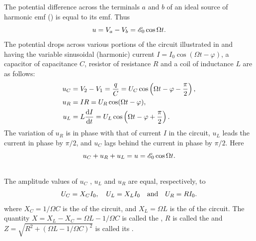 \subsection{}\label{29.3.4} The potential difference across the terminals $a$ and $b$ of an ideal source of harmonic emf () is equal to its emf. Thus
\begin{equation*}%
u = V_{a} - V_{b} = \emf_{0} \cos \Omega t.
\end{equation*}
The potential drops across various portions of the circuit illustrated in  and having the variable sinusoidal (harmonic) current $I = I_{0}\cos (\Omega t - \varphi)$, a capacitor of capacitance $C$, resistor of resistance $R$ and a coil of inductance $L$ are as follows:
\begin{align*}%
u_{C} & = V_{2} - V_{1} = \frac{q}{C} = U_{C} \cos \left( \Omega t - \varphi - \frac{\pi}{2} \right), \\ 
u_{R} & = IR =  U_{R} \cos ( \Omega t - \varphi), \\ 
u_{L} & = L \dv{I}{t} = U_{L} \cos \left( \Omega t - \varphi + \frac{\pi}{2} \right).
\end{align*}
The variation of $u_{R}$ is in phase with that of current $I$ in the circuit, $u_{L}$ leads the current in phase by $\pi/2$, and $u_{C}$ lags behind the current in phase by $\pi/2$. Here
\begin{equation*}%
u_{C} + u_{R} + u_{L} = u =  \emf_{0} \cos \Omega t.
\end{equation*}

\subsection{}\label{29.3.5} The amplitude values of $u_{C}$ , $u_{L}$ and $u_{R}$ are equal, respectively, to
\begin{equation*}%
U_{C} = X_{C}I_{0}, \quad U_{L}= X_{L}I_{0} \qand U_{R}  =RI_{0}.
\end{equation*}
where $X_{C} = 1/\Omega C$ is the  of the circuit, and $X_{L} = \Omega L$ is the  of the circuit. The quantity $X = X_{L} - X_{C} = \Omega L - 1/\Omega C$ is called the , $R$ is called the  and $Z = \sqrt{ R^{2} + (\Omega L - 1/\Omega C)^{2}}$ is called its .


